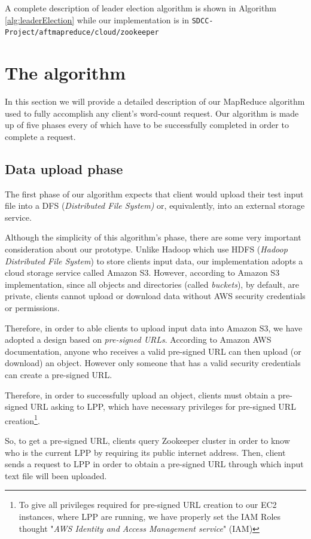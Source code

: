 \documentclass[sigchi]{acmart}
\begin{document}
A complete description of leader election algorithm is shown in Algorithm \ref{alg:leaderElection} while our implementation is in \texttt{SDCC-Project/aftmapreduce/cloud/zookeeper}

\section{The algorithm}

In this section we will provide a detailed description of our MapReduce algorithm used to fully accomplish any client's word-count request. Our algorithm is made up of five phases every of which have to be successfully completed in order to complete a request.

\subsection{Data upload phase}

The first phase of our algorithm expects that client would upload their test input file into a DFS (\textit{Distributed File System)} or, equivalently, into an external storage service.

Although the simplicity of this algorithm's phase, there are some very important consideration about our prototype. Unlike Hadoop which use HDFS (\textit{Hadoop Distributed File System}) to store clients input data, our implementation adopts a cloud storage service called Amazon S3. However, according to Amazon S3 implementation, since all objects and directories (called \textit{buckets}), by default, are private, clients cannot upload or download data without AWS security credentials or permissions.

Therefore, in order to able clients to upload input data into Amazon S3, we have adopted a design based on \textit{pre-signed URLs}. According to Amazon AWS documentation, anyone who receives a valid pre-signed URL can then upload (or download) an object. However only someone that has a valid security credentials can create a pre-signed URL. 

Therefore, in order to successfully upload an object, clients must obtain a pre-signed URL asking to LPP, which  have necessary privileges for pre-signed URL creation\footnote{To give all privileges required for pre-signed URL creation to our EC2 instances, where LPP are running, we have properly set the IAM Roles thought "\textit{AWS Identity and Access Management service}" (IAM)}.
 
So, to get a pre-signed URL, clients query Zookeeper cluster in order to know who is the current LPP by requiring its public internet address. Then, client sends a request to LPP in order to obtain a pre-signed URL through which input text file will been uploaded. 
\end{document}
